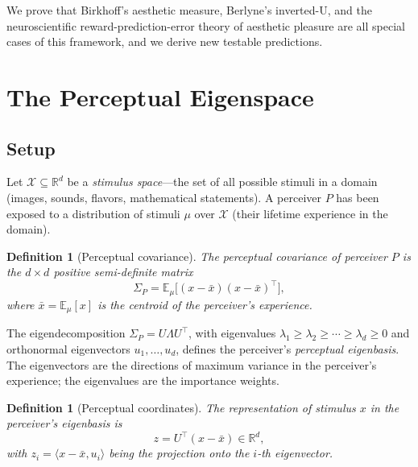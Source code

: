 \documentclass[journal]{IEEEtran}
\newtheorem{definition}[theorem]{Definition}
\newcommand{\R}{\mathbb{R}}
\newcommand{\E}{\mathbb{E}}
\newcommand{\ip}[2]{\langle #1, #2 \rangle}
\begin{document}
We prove that Birkhoff's aesthetic measure, Berlyne's inverted-U, and
the neuroscientific reward-prediction-error theory of aesthetic pleasure
are all special cases of this framework, and we derive new testable
predictions.


\section{The Perceptual Eigenspace}
\label{sec:eigenspace}

\subsection{Setup}

Let $\mathcal{X} \subseteq \R^d$ be a \emph{stimulus space}---the set
of all possible stimuli in a domain (images, sounds, flavors,
mathematical statements).  A perceiver $P$ has been exposed to a
distribution of stimuli $\mu$ over $\mathcal{X}$ (their lifetime
experience in the domain).

\begin{definition}[Perceptual covariance]
\label{def:cov}
The \emph{perceptual covariance} of perceiver $P$ is the
$d \times d$ positive semi-definite matrix
\begin{equation}
    \Sigma_P = \E_\mu\bigl[(x - \bar{x})(x - \bar{x})^\top\bigr],
    \label{eq:cov}
\end{equation}
where $\bar{x} = \E_\mu[x]$ is the centroid of the perceiver's
experience.
\end{definition}

The eigendecomposition $\Sigma_P = U \Lambda U^\top$, with eigenvalues
$\lambda_1 \geq \lambda_2 \geq \cdots \geq \lambda_d \geq 0$ and
orthonormal eigenvectors $u_1, \ldots, u_d$, defines the perceiver's
\emph{perceptual eigenbasis}.  The eigenvectors are the directions of
maximum variance in the perceiver's experience; the eigenvalues are the
importance weights.

\begin{definition}[Perceptual coordinates]
\label{def:coords}
The representation of stimulus $x$ in the perceiver's eigenbasis is
\begin{equation}
    z = U^\top(x - \bar{x}) \in \R^d,
    \label{eq:coords}
\end{equation}
with $z_i = \ip{x - \bar{x}}{u_i}$ being the projection onto the
$i$-th eigenvector.
\end{definition}
\end{document}
